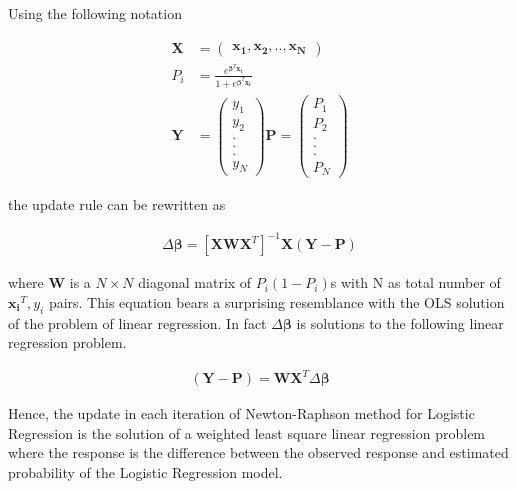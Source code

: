\documentclass[11pt, a4paper]{article}
\begin{document}
Using the following notation

\begin{align*}
	\boldsymbol{X} & = \begin{pmatrix} \boldsymbol{x_1}, \boldsymbol{x_2}, .., \boldsymbol{x_N}\end{pmatrix}         \\
	P_i            & = \frac{e^{\boldsymbol{\beta}^T\boldsymbol{x_i}}}{1 + e^{\boldsymbol{\beta}^T\boldsymbol{x_i}}} \\
	\boldsymbol{Y} & = \begin{pmatrix} y_1                                                                           \\ y_2 \\ . \\ . \\ . \\ y_N \end{pmatrix} 
	\boldsymbol{P} = \begin{pmatrix} P_1 \\ P_2 \\ . \\ . \\ . \\ P_N \end{pmatrix}
\end{align*} 

the update rule can be rewritten as

\begin{align*}
	\Delta \boldsymbol{\beta} = [\boldsymbol{X}\boldsymbol{W}\boldsymbol{X}^T]^{-1}\boldsymbol{X}(\boldsymbol{Y}-\boldsymbol{P}) 
\end{align*}

where $\boldsymbol{W}$ is a $N\times N$ diagonal matrix of $P_i(1-P_i)$s with N as total number of $\boldsymbol{x_i}^T, y_i$ pairs. This equation bears a surprising resemblance with the OLS solution of the problem of linear regression. In fact $\Delta \boldsymbol{\beta}$ is solutions to the following linear regression problem.

\begin{align*}
	(\boldsymbol{Y}-\boldsymbol{P}) = \boldsymbol{W}\boldsymbol{X}^T \Delta \boldsymbol{\beta} 
\end{align*}


Hence, the update in each iteration of Newton-Raphson method for Logistic Regression is the solution of a weighted least square linear regression problem where the response is the difference between the observed response and estimated probability of the Logistic Regression model.
\end{document}
